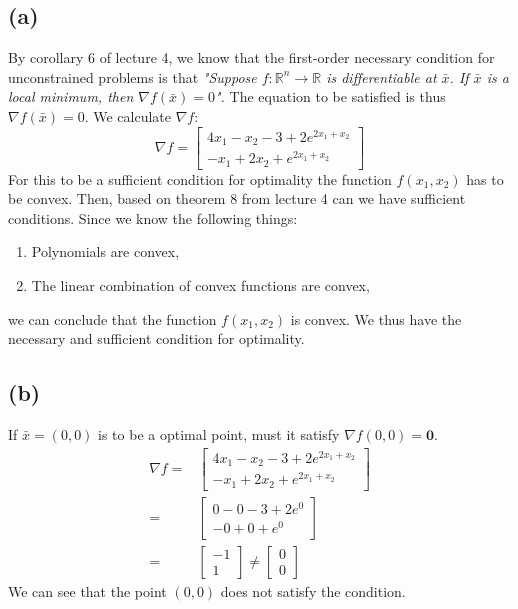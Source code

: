 \documentclass{article}
\begin{document}
\subsection*{(a)}
	By corollary 6 of lecture 4, we know that the first-order necessary condition for unconstrained problems is that \textit{"Suppose $f : \mathbb{R}^n \rightarrow \mathbb{R}$ is differentiable at $\bar{x}$. If $\bar{x}$ is a local minimum, then $\nabla f(\bar{x}) = 0$".}	The equation to be satisfied is thus $\nabla f(\bar{x}) = 0$. We calculate $\nabla f$:
	\begin{equation}
		\nabla f =
			\begin{bmatrix}
			4x_1-x_2-3+ 2 e^{2 x_1 + x_2} \\
			-x_1+2x_2 + e^{2x_1+x_2}
			\end{bmatrix}
	\end{equation}
	For this to be a sufficient condition for optimality the function $f(x_1,x_2)$ has to be convex. Then, based on theorem 8 from lecture 4 can we have sufficient conditions. Since we know the following things:
	\begin{enumerate}
		\item Polynomials are convex,
		\item The linear combination of convex functions are convex,
	\end{enumerate}
	we can conclude that the function $f(x_1,x_2)$ is convex. We thus have the necessary and sufficient condition for optimality.
\subsection*{(b)}
	If $\bar{x}=(0,0)$ is to be a optimal point, must it satisfy $\nabla f(0,0) = \boldsymbol{0}$. 
	\begin{align}
		\nabla f =&
			\begin{bmatrix}
				4x_1-x_2-3+ 2 e^{2 x_1 + x_2} \\
				-x_1+2x_2 + e^{2x_1+x_2}
			\end{bmatrix} \\
		=& \begin{bmatrix}
				0-0-3+ 2 e^{0} \\
				-0+0 + e^{0}
			\end{bmatrix}\\
		=& \begin{bmatrix}
				-1 \\
				1
		\end{bmatrix} \neq
		\begin{bmatrix}
			0 \\
			0
		\end{bmatrix}
	\end{align}
	We can see that the point $(0,0)$ does not satisfy the condition.
	
\end{document}
